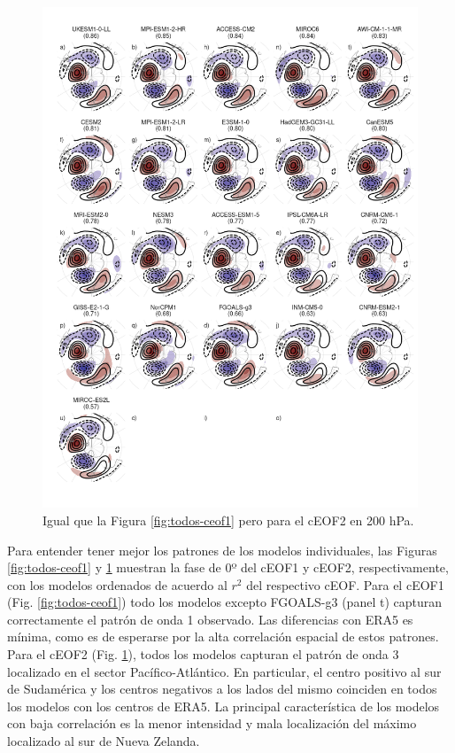 \documentclass[12pt,oneside,a4paper]{reedthesis}
\begin{document}
\begin{figure}

{\centering \includegraphics{figures/50-cmip6/todos-ceof2-1} 

}

\caption{Igual que la Figura \ref{fig:todos-ceof1} pero para el cEOF2 en 200 hPa.}\label{fig:todos-ceof2}
\end{figure}



Para entender tener mejor los patrones de los modelos individuales, las Figuras \ref{fig:todos-ceof1} y \ref{fig:todos-ceof2} muestran la fase de 0º del cEOF1 y cEOF2, respectivamente, con los modelos ordenados de acuerdo al \(r^2\) del respectivo cEOF.
Para el cEOF1 (Fig. \ref{fig:todos-ceof1}) todo los modelos excepto FGOALS-g3 (panel t) capturan correctamente el patrón de onda 1 observado.
Las diferencias con ERA5 es mínima, como es de esperarse por la alta correlación espacial de estos patrones.
Para el cEOF2 (Fig. \ref{fig:todos-ceof2}), todos los modelos capturan el patrón de onda 3 localizado en el sector Pacífico-Atlántico.
En particular, el centro positivo al sur de Sudamérica y los centros negativos a los lados del mismo coinciden en todos los modelos con los centros de ERA5.
La principal característica de los modelos con baja correlación es la menor intensidad y mala localización del máximo localizado al sur de Nueva Zelanda.
\end{document}
